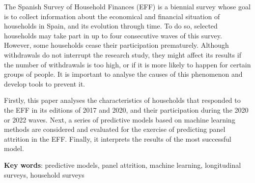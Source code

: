 The Spanish Survey of Household Finances (EFF) is a biennial survey whose goal is to collect information about the economical and financial situation of households in Spain, and its evolution through time. To do so, selected households may take part in up to four consecutive waves of this survey. However, some households cease their participation prematurely. Although withdrawals do not interrupt the research study, they might affect its results if the number of withdrawals is too high, or if it is more likely to happen for certain groups of people. It is important to analyse the causes of this phenomenon and develop tools to prevent it.

Firstly, this paper analyses the characteristics of households that responded to the EFF in its editions of 2017 and 2020, and their participation during the 2020 or 2022 waves. Next, a series of predictive models based on machine learning methods are considered and evaluated for the exercise of predicting panel attrition in the EFF. Finally, it interprets the results of the most successful model.

\vspace{1.5cm}

\textbf{Key words}: predictive models, panel attrition, machine learning, longitudinal surveys, household surveys